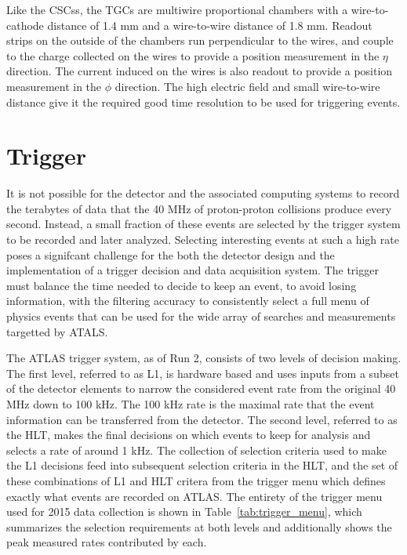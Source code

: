 Like the \acp{CSC}s, the \acp{TGC} are multiwire proportional chambers with a wire-to-cathode distance of 1.4 mm and a wire-to-wire distance of 1.8 mm.
Readout strips on the outside of the chambers run perpendicular to the wires, and couple to the charge collected on the wires to provide a position measurement in the $\eta$ direction.
The current induced on the wires is also readout to provide a position measurement in the $\phi$ direction.
The high electric field and small wire-to-wire distance give it the required good time resolution to be used for triggering events. 


\section{Trigger}
\label{sec:trigger}

It is not possible for the detector and the associated computing systems to record the terabytes of data that the 40 MHz of proton-proton collisions produce every second.
Instead, a small fraction of these events are selected by the trigger system to be recorded and later analyzed.
Selecting interesting events at such a high rate poses a signifcant challenge for the both the detector design and the implementation of a trigger decision and data acquisition system.
The trigger must balance the time needed to decide to keep an event, to avoid losing information, with the filtering accuracy to consistently select a full menu of physics events that can be used for the wide array of searches and measurements targetted by \ac{ATALS}. 

The \ac{ATLAS} trigger system, as of Run 2, consists of two levels of decision making. 
The first level, referred to as L1, is hardware based and uses inputs from a subset of the detector elements to narrow the considered event rate from the original 40 MHz down to 100 kHz.
The 100 kHz rate is the maximal rate that the event information can be transferred from the detector.
The second level, referred to as the \ac{HLT}, makes the final decisions on which events to keep for analysis and selects a rate of around 1 kHz.
The collection of selection criteria used to make the L1 decisions feed into subsequent selection criteria in the \ac{HLT}, and the set of these combinations of L1 and \ac{HLT} critera from the trigger menu which defines exactly what events are recorded on \ac{ATLAS}.
The entirety of the trigger menu used for 2015 data collection is shown in Table~\ref{tab:trigger_menu}, which summarizes the selection requirements at both levels and additionally shows the peak measured rates contributed by each.

